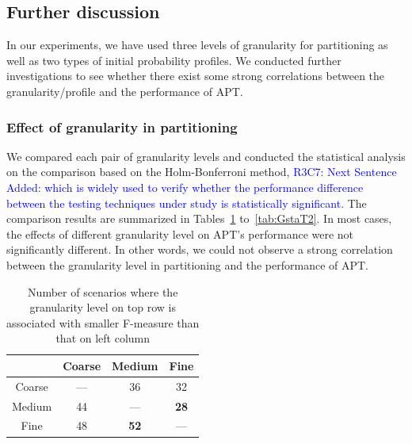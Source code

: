 \documentclass[10pt,journal,compsoc]{IEEEtran}
\begin{document}

\subsection{Further discussion}

In our experiments, we have used three levels of granularity for partitioning as well as two types of initial probability profiles. We conducted further investigations to see whether there exist some strong correlations between the granularity/profile and the performance of APT.

\subsubsection{Effect of granularity in partitioning}

We compared each pair of granularity levels and conducted the statistical analysis on the comparison based on the Holm-Bonferroni method,  \textcolor{blue}{R3C7: Next Sentence Added: which is widely used to verify whether the performance difference between the testing techniques under study is statistically significant}. The comparison results are summarized in Tables~\ref{tab:GstaF} to~\ref{tab:GstaT2}. In most cases, the effects of different granularity level on APT's performance were not significantly different. In other words, we could not observe a strong correlation between the granularity level in partitioning and the performance of APT.


\begin{table}
\caption{Number of scenarios where the granularity level on top row is associated with smaller F-measure than that on left column}
\label{tab:GstaF}
\centering
\begin{tabular}{|c|c|c|c|} \hline
		& Coarse			& Medium			    & Fine				\\ \hline
Coarse	& ---				& 36					& 32				\\ \hline
Medium	& 44				& ---					& \textbf{28}	    \\ \hline
Fine	& 48			    & \textbf{52}	        & ---				\\ \hline
\end{tabular}
\end{table}
\end{document}
